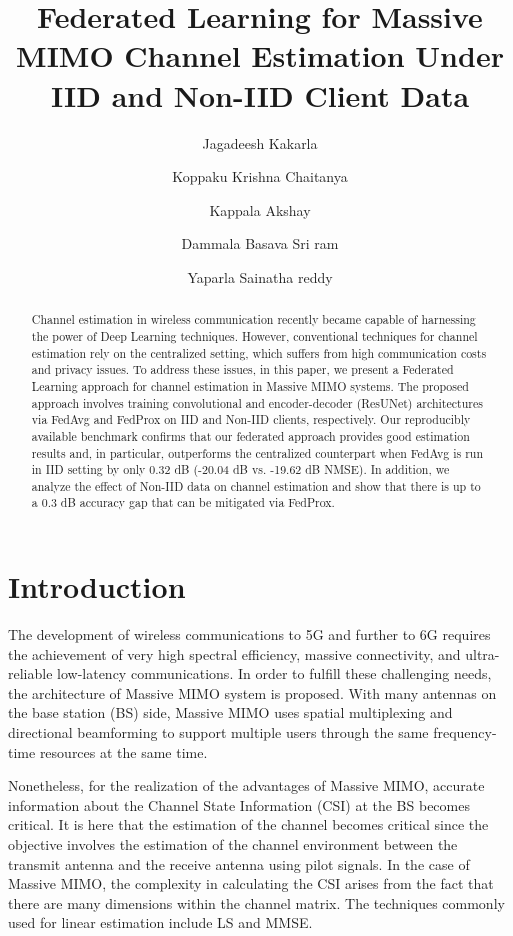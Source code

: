 \documentclass[runningheads]{llncs}
\title{Federated Learning for Massive MIMO Channel Estimation Under IID and Non-IID Client Data}
\author{Jagadeesh Kakarla\inst{1} \and Koppaku Krishna Chaitanya\inst{1} \and Kappala Akshay\inst{1} \and Dammala Basava Sri ram\inst{1} \and Yaparla Sainatha reddy\inst{1}}
\institute{Indian Institute of Information Technology, Design and Manufacturing, Kancheepuram, India\\
\email{jagadeeshk@iiitdm.ac.in, krish23306@gmail.com, dammala.sriram9@gmail.com, akshaykappala1029@gmail.com, sainathreddy057@gmail.com}}
\begin{document}
\maketitle

\begin{abstract}
Channel estimation in wireless communication recently became capable of harnessing the power of Deep Learning techniques. However, conventional techniques for channel estimation rely on the centralized setting, which suffers from high
communication costs and privacy issues. To address these issues, in this paper, we present a Federated Learning approach
for channel estimation in Massive MIMO systems. The proposed
approach involves training convolutional and encoder-decoder
(ResUNet) architectures via FedAvg and FedProx on IID and
Non-IID clients, respectively. Our reproducibly available benchmark confirms that our federated approach provides good estimation results and, in particular, outperforms the centralized counterpart when FedAvg is run in IID setting by only 0.32 dB (-20.04 dB vs. -19.62 dB NMSE). In addition, we analyze the effect of Non-IID data on channel estimation and show that there is up to a 0.3 dB accuracy gap that can be mitigated via FedProx.
\end{abstract}

\section{Introduction}
The development of wireless communications to 5G and further to 6G requires the achievement of very high spectral efficiency, massive connectivity, and ultra-reliable low-latency communications. In order to fulfill these challenging needs, the
architecture of Massive MIMO system is proposed. With many antennas on the base station (BS) side, Massive MIMO uses spatial multiplexing and directional beamforming to support multiple users through the same frequency-time resources at the same time.

Nonetheless, for the realization of the advantages of Massive MIMO, accurate information about the Channel State Information (CSI) at the BS becomes critical. It is here that the estimation of the channel becomes critical since the objective involves the estimation of the channel environment between the transmit antenna and the receive antenna using pilot signals. In the case of Massive MIMO, the complexity in calculating the CSI arises from the fact that there are many dimensions within the channel matrix. The techniques commonly used for linear estimation include LS and MMSE.
\end{document}
